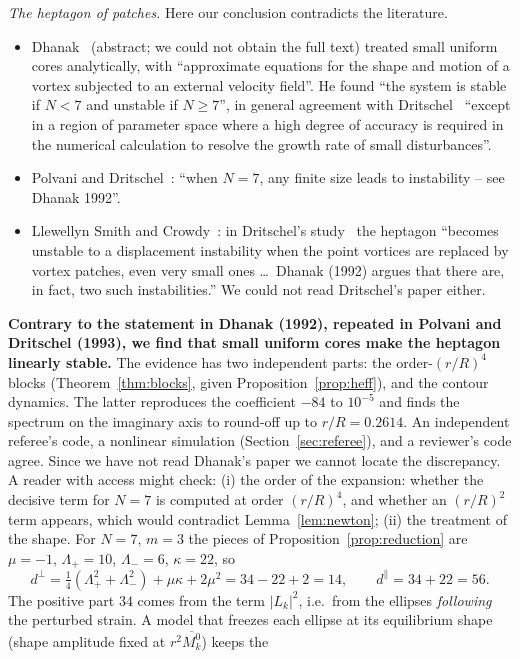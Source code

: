 \documentclass[11pt]{article}
\theoremstyle{definition}
\theoremstyle{remark}
\begin{document}
\emph{The heptagon of patches.} Here our conclusion contradicts the literature.
\begin{itemize}
\item Dhanak~\cite{Dhanak1992} (abstract; we could not obtain the full text) treated small uniform cores analytically, with
``approximate equations for the shape and motion of a vortex subjected to an external velocity field''. He found ``the
system is stable if $N<7$ and unstable if $N\ge7$'', in general agreement with Dritschel~\cite{Dritschel1985} ``except in a
region of parameter space where a high degree of accuracy is required in the numerical calculation to resolve the growth
rate of small disturbances''.
\item Polvani and Dritschel~\cite[p.~52]{PolvaniDritschel1993}: ``when $N=7$, any finite size leads to instability -- see
Dhanak 1992''.
\item Llewellyn Smith and Crowdy~\cite{LlewellynSmithCrowdy2012}: in Dritschel's study~\cite{Dritschel1985} the heptagon
``becomes unstable to a displacement instability when the point vortices are replaced by vortex patches, even very small
ones \dots\ Dhanak (1992) argues that there are, in fact, two such instabilities.'' We could not read Dritschel's paper
either.
\end{itemize}
\textbf{Contrary to the statement in Dhanak (1992), repeated in Polvani and Dritschel (1993), we find that small uniform cores
make the heptagon linearly stable.} The evidence has two independent parts: the order-$(r/R)^4$ blocks
(Theorem~\ref{thm:blocks}, given Proposition~\ref{prop:heff}), and the contour dynamics. The latter reproduces the
coefficient $-84$ to $10^{-5}$ and finds the spectrum on the imaginary axis to round-off up to $r/R=0.2614$. An independent referee's
code, a nonlinear simulation (Section~\ref{sec:referee}), and a reviewer's code agree. Since we have not read Dhanak's
paper we cannot locate the discrepancy. A reader with access might check:
(i) the order of the expansion: whether the decisive term for $N=7$ is computed at order $(r/R)^4$, and whether an
$(r/R)^2$ term appears, which would contradict Lemma~\ref{lem:newton};
(ii) the treatment of the shape. For $N=7$, $m=3$ the pieces of Proposition~\ref{prop:reduction} are $\mu=-1$,
$\Lambda_+=10$, $\Lambda_-=6$, $\kappa=22$, so
\[ d^\perp=\tfrac14(\Lambda_+^2+\Lambda_-^2)+\mu\kappa+2\mu^2=34-22+2=14,\qquad d^\parallel=34+22=56. \]
The positive part $34$ comes from the term $|L_k|^2$, i.e.\ from the ellipses \emph{following} the perturbed strain. A
model that freezes each ellipse at its equilibrium shape (shape amplitude fixed at $r^2\overline{M_k^0}$) keeps the
\end{document}
